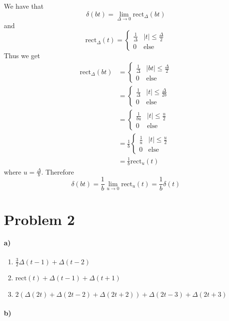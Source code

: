 \documentclass[12pt]{article}
\begin{document}
We have that
\[\delta(bt)=\lim_{\Delta\to 0} \text{rect}_{\Delta}(bt)\]
and
\[
	\text{rect}_{\Delta}(t)=
	\begin{cases}
		\frac{1}{\Delta} & |t|\leq\frac{\Delta}{2}\\
		0 & \text{else}
	\end{cases}
\]
Thus we get
\begin{align*}
	\text{rect}_{\Delta}(bt)&=
	\begin{cases}
		\frac{1}{\Delta} & |bt|\leq\frac{\Delta}{2}\\
		0 & \text{else}
	\end{cases}\\
	&=
	\begin{cases}
		\frac{1}{\Delta} & |t|\leq\frac{\Delta}{2b}\\
		0 & \text{else}
	\end{cases}\\
	&=
	\begin{cases}
		\frac{1}{bu} & |t|\leq\frac{u}{2}\\
		0 & \text{else}
	\end{cases}\\
	&=
	\frac{1}{b}
	\begin{cases}
		\frac{1}{u} & |t|\leq\frac{u}{2}\\
		0 & \text{else}
	\end{cases}\\
	&=\frac{1}{b}\text{rect}_u(t)
\end{align*}
where \(u=\frac{\Delta}{b}\). Therefore
\[\delta(bt)=\frac{1}{b}\lim_{u\to 0} \text{rect}_{u}(t)=\frac{1}{b}\delta(t)\]

\section*{Problem 2}

\paragraph{a)}

\begin{enumerate}
	\item \(\frac{3}{2}\Delta(t-1) + \Delta(t-2)\)
	\item \(\text{rect}(t)+\Delta(t-1)+\Delta(t+1)\)
	\item \(2(\Delta(2t)+\Delta(2t-2)+\Delta(2t+2))+\Delta(2t-3)+\Delta(2t+3)\)
\end{enumerate}

\paragraph{b)}
\end{document}
